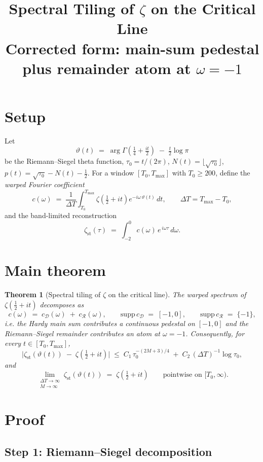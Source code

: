 \documentclass[11pt]{article}
\title{Spectral Tiling of $\zeta$ on the Critical Line\\
{\large Corrected form: main-sum pedestal plus remainder atom at $\omega=-1$}}
\author{}
\date{}
\newtheorem{theorem}{Theorem}
\begin{document}
\maketitle

\section*{Setup}

Let
\[
  \vartheta(t) \;=\; \arg\Gamma\!\left(\tfrac{1}{4}+\tfrac{it}{2}\right) \;-\; \tfrac{t}{2}\log\pi
\]
be the Riemann--Siegel theta function, $\tau_{0} = t/(2\pi)$, $N(t)=\lfloor\sqrt{\tau_{0}}\rfloor$, $p(t)=\sqrt{\tau_{0}}-N(t)-\tfrac12$. For a window $[T_{0},T_{\max}]$ with $T_{0}\ge 200$, define the \emph{warped Fourier coefficient}
\[
  c(\omega) \;=\; \frac{1}{\Delta T}\int_{T_{0}}^{T_{\max}} \zeta\!\left(\tfrac{1}{2}+it\right) e^{-i\omega\,\vartheta(t)}\,dt,
  \qquad \Delta T = T_{\max}-T_{0},
\]
and the band-limited reconstruction
\[
  \zeta_{\mathrm{st}}(\tau) \;=\; \int_{-2}^{0} c(\omega)\,e^{\,i\omega\tau}\,d\omega.
\]

\section*{Main theorem}

\begin{theorem}[Spectral tiling of $\zeta$ on the critical line]\label{thm:main}
The warped spectrum of $\zeta(\tfrac12+it)$ decomposes as
\[
  c(\omega) \;=\; c_{\mathcal D}(\omega) \;+\; c_{\mathcal R}(\omega),
  \qquad
  \mathrm{supp}\,c_{\mathcal D} \;=\; [-1,0],
  \qquad
  \mathrm{supp}\,c_{\mathcal R} \;=\; \{-1\},
\]
i.e. the Hardy main sum contributes a continuous pedestal on $[-1,0]$ and the Riemann--Siegel remainder contributes an atom at $\omega=-1$. Consequently, for every $t\in[T_{0},T_{\max}]$,
\[
  \bigl|\zeta_{\mathrm{st}}(\vartheta(t)) \;-\; \zeta(\tfrac12+it)\bigr|
  \;\le\; C_{1}\,\tau_{0}^{-(2M+3)/4} \;+\; C_{2}\,(\Delta T)^{-1}\log\tau_{0},
\]
and
\[
  \lim_{\substack{\Delta T\to\infty \\ M\to\infty}} \zeta_{\mathrm{st}}(\vartheta(t)) \;=\; \zeta(\tfrac12+it)
  \qquad \text{pointwise on } [T_{0},\infty).
\]
\end{theorem}

\section*{Proof}

\subsection*{Step 1: Riemann--Siegel decomposition}
\end{document}
